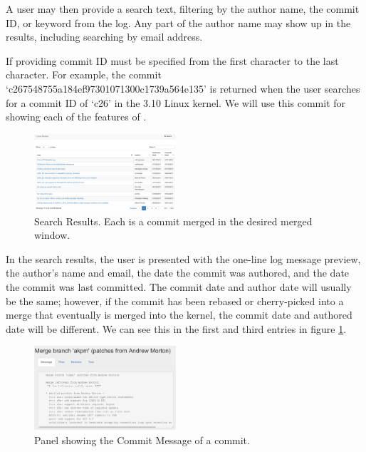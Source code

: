 \documentclass[conference, draftclsnofoot, draft]{IEEEtran}
\begin{document}
A user may then provide a search text, filtering by the author name,
the commit ID, or keyword from the log. Any part of the author name may show up in
the results, including searching by email address. 

If providing commit ID must be specified
from the first character to the last character. For example, the commit
`c267548755a184ef97301071300c1739a564e135' is returned when the user searches for a
commit ID of `c26' in the 3.10 Linux kernel. We will use this commit for showing
each of the features of \tool.

\begin{figure}
        \centering
        \includegraphics[width=0.47\textwidth]{figures/search_results_2.png}
        \caption{Search Results. Each is a commit merged in the desired merged window.}
        \label{fig:results}
\end{figure}

In the search results, the user is presented with the one-line log message preview,
the author's name and email, the date the commit was authored, and the date the
commit was last committed. The commit date and author date will usually be the same;
however, if the commit has been rebased or cherry-picked into a merge that
eventually is merged into the kernel, the commit date and authored date will be
different. We can see this in the first and third entries in figure
\ref{fig:results}.

\begin{figure}
        \centering
        \includegraphics[width=0.47\textwidth]{figures/log_view.png}
        \caption{Panel showing the Commit Message of a commit.}
        \label{fig:message}
\end{figure}
\end{document}
